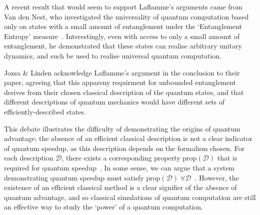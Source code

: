 \documentclass{standalone}
\begin{document}
\par
A recent result that would seem to support Laflamme's arguments came from Van den Nest, who investigated the universality of quantum computation based only on states with a small amount of entanglement under the `Entanglement Entropy' measure~\cite{VanDenNest2013}. Interestingly, even with access to only a small amount of entanglement, he demonstrated that these states can realise arbitrary unitary dynamics, and such be used to realise universal quantum computation. 
\par
Jozsa \& Linden acknowledge Laflamme's argument in the conclusion to their paper, agreeing that this appareny requirment for unbounded entanglement derives from their chosen classical description of the quantum states, and that different descriptions of quantum mechanics would have different sets of efficiently-described states. 
\par
This debate illustrates the difficulty of demonstrating the origins of quantum advantage; the absence of an efficient classical description is not a clear indicator of quantum speedup, as this description depends on the formalism chosen. For each description $\mathcal{D}$, there exists a corresponding property $\text{prop}(\mathcal{D})$ that is required for quantum speedup~\cite{Jozsa2003}. In some sense, we can argue that a system demonstrating quantum speedup must satisfy $\text{prop}(\mathcal{D})\;\forall\mathcal{D}$~\cite{Jozsa2003,Laflamme2001}. However, the existence of an efficient classical method is a clear signifier of the absence of quantum advantage, and so classical simulations of quantum computation are still an effective way to study the `power' of a quantum computation.
\par
\end{document}
